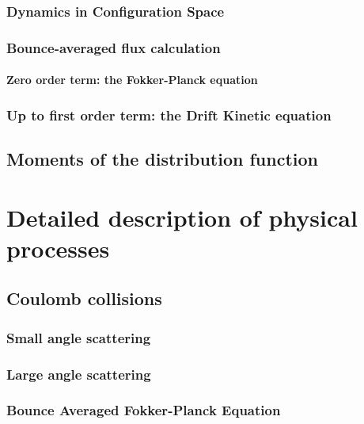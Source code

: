 \documentclass[11pt,a4paper]{report}
\begin{document}
		\subsection{Dynamics in Configuration Space}
		

		\subsection{Bounce-averaged flux calculation}

		\subsubsection{Zero order term: the Fokker-Planck equation}
		

		\subsection{Up to first order term: the Drift Kinetic equation}
		

	\section{Moments of the distribution function}
	

\chapter{Detailed description of physical processes}
\label{physproc}

	\section{Coulomb collisions}

		\subsection{Small angle scattering}
		

		\subsection{Large angle scattering}

		\subsection{Bounce Averaged Fokker-Planck Equation}
		
\end{document}
